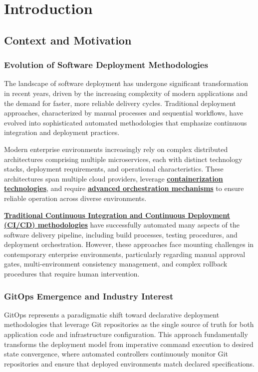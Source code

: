 \chapter{Introduction}

\section{Context and Motivation}

\subsection{Evolution of Software Deployment Methodologies}
The landscape of software deployment has undergone significant transformation in recent years, driven by the increasing complexity of modern applications and the demand for faster, more reliable delivery cycles. Traditional deployment approaches, characterized by manual processes and sequential workflows, have evolved into sophisticated automated methodologies that emphasize continuous integration and deployment practices.

Modern enterprise environments increasingly rely on complex distributed architectures comprising multiple microservices, each with distinct technology stacks, deployment requirements, and operational characteristics. These architectures span multiple cloud providers, leverage \textbf{\hyperref[docker2023documentation]{containerization technologies}}, and require \textbf{\hyperref[kubernetes_docs]{advanced orchestration mechanisms}} to ensure reliable operation across diverse environments.

\textbf{\hyperref[fowler2013continuous]{Traditional Continuous Integration and Continuous Deployment (CI/CD) methodologies}} have successfully automated many aspects of the software delivery pipeline, including build processes, testing procedures, and deployment orchestration. However, these approaches face mounting challenges in contemporary enterprise environments, particularly regarding manual approval gates, multi-environment consistency management, and complex rollback procedures that require human intervention.

\subsection{GitOps Emergence and Industry Interest}
GitOps represents a paradigmatic shift toward declarative deployment methodologies that leverage Git repositories as the single source of truth for both application code and infrastructure configuration. This approach fundamentally transforms the deployment model from imperative command execution to desired state convergence, where automated controllers continuously monitor Git repositories and ensure that deployed environments match declared specifications.

